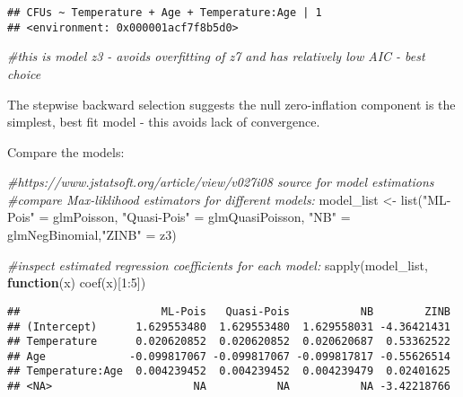 \documentclass[
]{article}
\newenvironment{Shaded}{\begin{snugshade}}{\end{snugshade}}
\newcommand{\CommentTok}[1]{\textcolor[rgb]{0.56,0.35,0.01}{\textit{#1}}}
\newcommand{\ControlFlowTok}[1]{\textcolor[rgb]{0.13,0.29,0.53}{\textbf{#1}}}
\newcommand{\DecValTok}[1]{\textcolor[rgb]{0.00,0.00,0.81}{#1}}
\newcommand{\FunctionTok}[1]{\textcolor[rgb]{0.00,0.00,0.00}{#1}}
\newcommand{\NormalTok}[1]{#1}
\newcommand{\OtherTok}[1]{\textcolor[rgb]{0.56,0.35,0.01}{#1}}
\newcommand{\SpecialCharTok}[1]{\textcolor[rgb]{0.00,0.00,0.00}{#1}}
\newcommand{\StringTok}[1]{\textcolor[rgb]{0.31,0.60,0.02}{#1}}
\begin{document}
\begin{Shaded}
\end{Shaded}

\begin{verbatim}
## CFUs ~ Temperature + Age + Temperature:Age | 1
## <environment: 0x000001acf7f8b5d0>
\end{verbatim}

\begin{Shaded}
\begin{Highlighting}[]
\CommentTok{\#this is model z3 {-} avoids overfitting of z7 and has relatively low AIC {-} best choice}
\end{Highlighting}
\end{Shaded}

The stepwise backward selection suggests the null zero-inflation
component is the simplest, best fit model - this avoids lack of
convergence.

Compare the models:

\begin{Shaded}
\begin{Highlighting}[]
\CommentTok{\#https://www.jstatsoft.org/article/view/v027i08 source for model estimations}
\CommentTok{\#compare Max{-}liklihood estimators for different models: }
\NormalTok{model\_list }\OtherTok{\textless{}{-}} \FunctionTok{list}\NormalTok{(}\StringTok{"ML{-}Pois"} \OtherTok{=}\NormalTok{ glmPoisson, }\StringTok{"Quasi{-}Pois"} \OtherTok{=}\NormalTok{ glmQuasiPoisson, }\StringTok{"NB"} \OtherTok{=}\NormalTok{ glmNegBinomial,}\StringTok{"ZINB"} \OtherTok{=}\NormalTok{ z3)}

\CommentTok{\#inspect estimated regression coefficients for each model:}
\FunctionTok{sapply}\NormalTok{(model\_list, }\ControlFlowTok{function}\NormalTok{(x) }\FunctionTok{coef}\NormalTok{(x)[}\DecValTok{1}\SpecialCharTok{:}\DecValTok{5}\NormalTok{])}
\end{Highlighting}
\end{Shaded}

\begin{verbatim}
##                      ML-Pois   Quasi-Pois           NB        ZINB
## (Intercept)      1.629553480  1.629553480  1.629558031 -4.36421431
## Temperature      0.020620852  0.020620852  0.020620687  0.53362522
## Age             -0.099817067 -0.099817067 -0.099817817 -0.55626514
## Temperature:Age  0.004239452  0.004239452  0.004239479  0.02401625
## <NA>                      NA           NA           NA -3.42218766
\end{verbatim}
\end{document}
